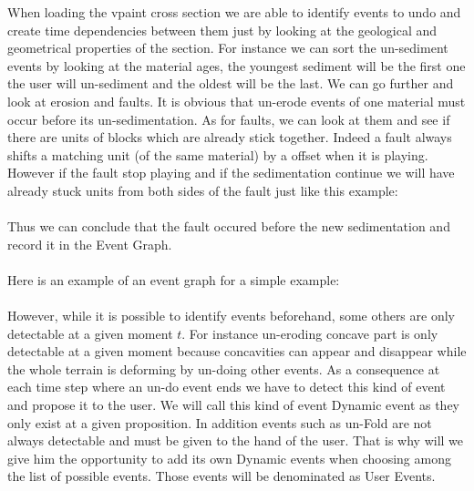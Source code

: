 \documentclass[12pt, a4paper]{memoir} %
\begin{document}
When loading the vpaint cross section we are able to identify events to undo  and create time dependencies between them just by looking at the geological and geometrical properties of the section. For instance we can sort the un-sediment events by looking at the material ages, the youngest sediment will be the first one the user will un-sediment and the oldest will be the last. We can go further and look at erosion and faults. It is obvious that un-erode events of one material must occur before its un-sedimentation. As for faults, we can look at them and see if there are units of blocks which are already stick together. Indeed a fault always shifts a matching unit (of the same material) by a offset when it is playing. However if the fault stop playing and if the sedimentation continue we will have already stuck units from both sides of the fault just like this example:\\\\

Thus we can conclude that the fault occured before the new sedimentation and record it in the Event Graph.\\\\

Here is an example of an event graph for a simple example:\\\\

However, while it is possible to identify events beforehand, some others are only detectable at a given moment $t$. For instance un-eroding concave part is only detectable at a given moment because concavities can appear and disappear while the whole terrain is deforming by un-doing other events. As a consequence at each time step where an un-do event ends we have to detect this kind of event and propose it to the user. We will call this kind of event Dynamic event as they only exist at a given proposition. In addition events such as un-Fold are not always detectable and must be given to the hand of the user. That is why will we give him the opportunity to add its own Dynamic events when choosing among the list of possible events. Those events will be denominated as User Events.\\\\
\end{document}
